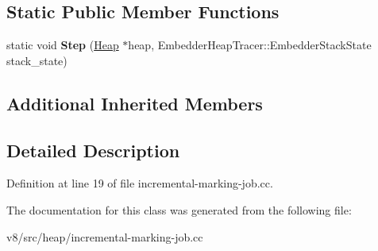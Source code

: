 \subsection*{Static Public Member Functions}
\begin{DoxyCompactItemize}
\item 
\mbox{\label{classv8_1_1internal_1_1IncrementalMarkingJob_1_1Task_a0c779d54a12bb26e5105ebc1052f3f59}} 
static void {\bfseries Step} (\mbox{\hyperlink{classv8_1_1internal_1_1Heap}{Heap}} $\ast$heap, Embedder\+Heap\+Tracer\+::\+Embedder\+Stack\+State stack\+\_\+state)
\end{DoxyCompactItemize}
\subsection*{Additional Inherited Members}


\subsection{Detailed Description}


Definition at line 19 of file incremental-\/marking-\/job.\+cc.



The documentation for this class was generated from the following file\+:\begin{DoxyCompactItemize}
\item 
v8/src/heap/incremental-\/marking-\/job.\+cc\end{DoxyCompactItemize}

